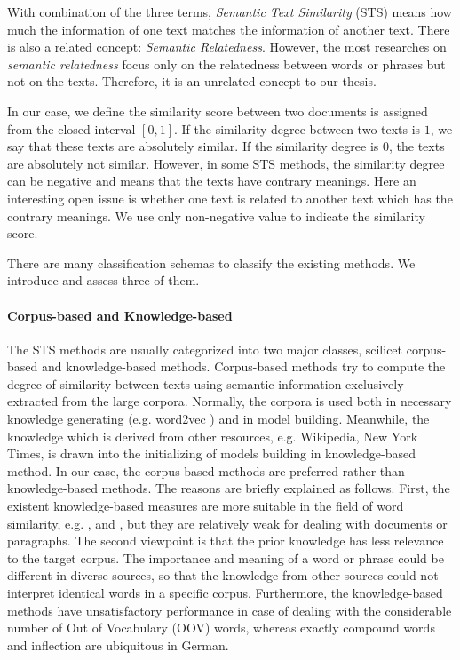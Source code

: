 With combination of the three terms, \textit{Semantic Text Similarity} (STS) means how much the information of one text matches the information of another text. There is also a related concept: \textit{Semantic Relatedness}. However, the most researches on \textit{semantic relatedness} \citep{rohrbach2010helps, gracia2008web, gabrilovich2007computing} focus only on the relatedness between words or phrases but not on the texts. Therefore, it is an unrelated concept to our thesis. 

In our case, we define the similarity score between two documents is assigned from the closed interval $[0, 1]$. If the similarity degree between two texts is $1$, we say that these texts are absolutely similar. If the similarity degree is $0$, the texts are absolutely not similar. However, in some STS methods, the similarity degree can be negative and means that the texts have contrary meanings. Here an interesting open issue is whether one text is related to another text which has the contrary meanings. We use only non-negative value to indicate the similarity score.

There are many classification schemas to classify the existing methods. We introduce and assess three of them. 

\paragraph{Corpus-based and Knowledge-based}
The STS methods are usually categorized into two major classes, scilicet corpus-based and knowledge-based methods. Corpus-based methods try to compute the degree of similarity between texts using semantic information exclusively extracted from the large corpora. Normally, the corpora is used both in necessary knowledge generating (e.g. word2vec \cite{mikolov2013efficient}) and in model building. Meanwhile, the knowledge which is derived from other resources, e.g. Wikipedia, New York Times, is drawn into the initializing of models building in knowledge-based method. In our case, the corpus-based methods are preferred rather than knowledge-based methods. The reasons are briefly explained as follows. First, the existent knowledge-based measures are more suitable in the field of word similarity, e.g. \cite{jiang1997semantic}, \cite{strube2006wikirelate} and \cite{Agirre2009ta}, but they are relatively weak for dealing with documents or paragraphs. The second viewpoint is that the prior knowledge has less relevance to the target corpus. The importance and meaning of a word or phrase could be different in diverse sources, so that the knowledge from other sources could not interpret identical words in a specific corpus. Furthermore, the knowledge-based methods have unsatisfactory performance in case of dealing with the considerable number of Out of Vocabulary (OOV) words, whereas exactly compound words and inflection are ubiquitous in German. 

